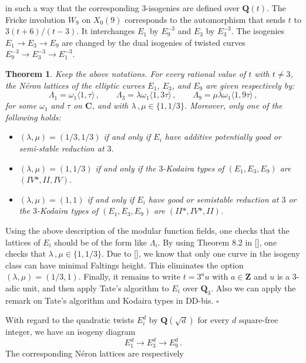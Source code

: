 \documentclass[
  journal=small,
  manuscript=article-type,  %
  year=2020,
  volume=37,
]{cup-journal}
\newtheorem{thm}{Theorem}
\begin{document}
in such a way that the corresponding $3$-isogenies are defined over $\mathbf{Q}(t)$. The Fricke involution $W_9$ on $X_0(9)$ corresponds to 
the automorphism that sends $t$ to 
$3 (t+6)/(t-3)$. It 
interchanges $E_1$ by $E_9^{-3}$ and $E_3$ by $E_3^{-3}$. The isogenies $E_1\to E_3\to E_9$ are changed by the dual isogenies of twisted curves
$E_9^{-3}\to E_3^{-3}\to E_1^{-3}$. 

\begin{thm}
Keep the above notations. For every rational 
value of $t$ with $t\neq 3$, 
the Néron lattices of the elliptic curves $E_1$, $E_3$, and $E_9$ are given respectively by:
$$
\Lambda_1 = \omega_1 \langle 1,\tau\rangle
\,,\qquad
\Lambda_3 = \lambda 
\omega_1 \langle 1,3\tau\rangle
\,,\qquad
\Lambda_9 = \mu \lambda 
\omega_1 \langle 1,9\tau\rangle\,,
$$
for some $\omega_1$ and $\tau$ on $\mathbf{C}$, and with $\lambda\,,\mu \in \{1,1/3\}$. Moreover, only one of the following holds:
\begin{itemize}
\item[(i)]
$(\lambda,\mu)=(1/3,1/3)$ if and only if 
$E_i$ have additive potentially good or semi-stable reduction at $3$.
\item[(ii)]
$(\lambda,\mu)=(1,1/3)$ if and only if the
$3$-Kodaira types of $(E_1,E_3,E_9)$ are $(IV*,II,IV)$.
\item[(iii)]
$(\lambda,\mu)=(1,1)$ if and only if 
$E_i$ have good or semistable reduction at $3$ or the 
$3$-Kodaira types of $(E_1,E_3,E_9)$ are $(II*,IV*,II)$.  
\end{itemize}
\end{thm}

Using the above description of the modular function fields,
one checks that
the lattices of $E_i$ should be of the form
like $\Lambda_i$.
By using Theorem 8.2 in [\cite{DD}], one checks that $\lambda\,,\mu \in \{1,1/3\}$.
Due to [\cite{STEVENS}], we know that only one curve in the isogeny class can have minimal Faltings height. This eliminates the option $(\lambda,\mu)=(1/3,1)$. 
Finally, it remains to write $t= 3^a u$ with $a\in\mathbf{Z}$ and $u$ is a $3$-adic unit, and then apply Tate's algorithm to $E_i$ over $\mathbf{Q}_3$. Also we can apply the remark on Tate's algorithm and Kodaira types in DD-bis.
\hfill $\square$






With regard to the quadratic twists $E_i^d$ by $\mathbf{Q}(\sqrt{d})$ for every $d$ square-free integer, we have an isogeny diagram 
$$
E_1^d \longrightarrow E_3^d \longrightarrow E_9^d\,.
$$
The corresponding Néron lattices are respectively
\end{document}
